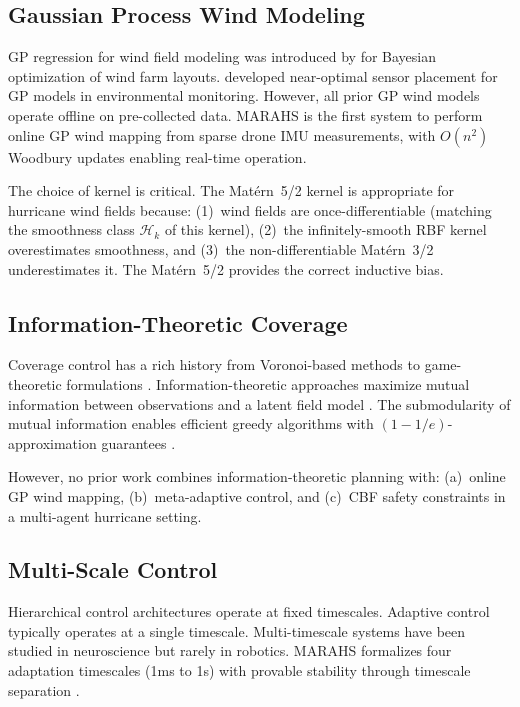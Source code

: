 \documentclass[12pt,a4paper,twocolumn]{article}
\newcommand{\cH}{\mathcal{H}}
\begin{document}
\subsection{Gaussian Process Wind Modeling}
\label{sec:related_gp}

GP regression for wind field modeling was introduced by \citet{Srinivas2010} for Bayesian optimization of wind farm layouts. \citet{Krause2008} developed near-optimal sensor placement for GP models in environmental monitoring. However, all prior GP wind models operate offline on pre-collected data. MARAHS is the first system to perform online GP wind mapping from sparse drone IMU measurements, with $O(n^2)$ Woodbury updates enabling real-time operation.

The choice of kernel is critical. The Mat\'ern~5/2 kernel \citep{Rasmussen2006} is appropriate for hurricane wind fields because: (1)~wind fields are once-differentiable (matching the smoothness class $\cH_k$ of this kernel), (2)~the infinitely-smooth RBF kernel overestimates smoothness, and (3)~the non-differentiable Mat\'ern~3/2 underestimates it. The Mat\'ern~5/2 provides the correct inductive bias.

\subsection{Information-Theoretic Coverage}
\label{sec:related_info}

Coverage control has a rich history from Voronoi-based methods \citep{Cortes2004} to game-theoretic formulations \citep{Schwager2011}. Information-theoretic approaches maximize mutual information between observations and a latent field model \citep{Krause2008,Singh2009}. The submodularity of mutual information enables efficient greedy algorithms with $(1-1/e)$-approximation guarantees \citep{Nemhauser1978}.

However, no prior work combines information-theoretic planning with: (a)~online GP wind mapping, (b)~meta-adaptive control, and (c)~CBF safety constraints in a multi-agent hurricane setting.

\subsection{Multi-Scale Control}
\label{sec:related_multiscale}

Hierarchical control architectures \citep{Rizk2019} operate at fixed timescales. Adaptive control \citep{Ioannou2012} typically operates at a single timescale. Multi-timescale systems have been studied in neuroscience \citep{Meehan2020} but rarely in robotics. MARAHS formalizes four adaptation timescales (1ms to 1s) with provable stability through timescale separation \citep{Khalil2002}.
\end{document}
